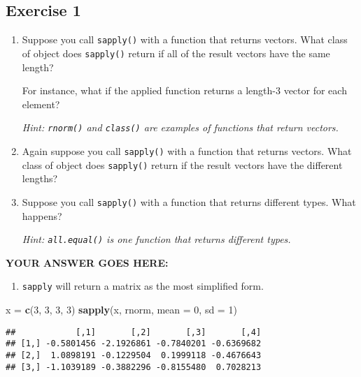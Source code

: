\documentclass[
]{article}
\newenvironment{Shaded}{\begin{snugshade}}{\end{snugshade}}
\newcommand{\DataTypeTok}[1]{\textcolor[rgb]{0.13,0.29,0.53}{#1}}
\newcommand{\DecValTok}[1]{\textcolor[rgb]{0.00,0.00,0.81}{#1}}
\newcommand{\KeywordTok}[1]{\textcolor[rgb]{0.13,0.29,0.53}{\textbf{#1}}}
\newcommand{\NormalTok}[1]{#1}
\newcommand{\StringTok}[1]{\textcolor[rgb]{0.31,0.60,0.02}{#1}}
\providecommand{\tightlist}{%
  \setlength{\itemsep}{0pt}\setlength{\parskip}{0pt}}
\begin{document}
\hypertarget{exercise-1}{%
\subsection{Exercise 1}\label{exercise-1}}

\begin{enumerate}
\def\labelenumi{\arabic{enumi}.}
\item
  Suppose you call \texttt{sapply()} with a function that returns
  vectors. What class of object does \texttt{sapply()} return if all of
  the result vectors have the same length?

  For instance, what if the applied function returns a length-3 vector
  for each element?

  \emph{Hint: \texttt{rnorm()} and \texttt{class()} are examples of
  functions that return vectors.}
\item
  Again suppose you call \texttt{sapply()} with a function that returns
  vectors. What class of object does \texttt{sapply()} return if the
  result vectors have the different lengths?
\item
  Suppose you call \texttt{sapply()} with a function that returns
  different types. What happens?

  \emph{Hint: \texttt{all.equal()} is one function that returns
  different types.}
\end{enumerate}

\textbf{YOUR ANSWER GOES HERE:}

\begin{enumerate}
\def\labelenumi{\arabic{enumi}.}
\tightlist
\item
  \texttt{sapply} will return a matrix as the most simplified form.
\end{enumerate}

\begin{Shaded}
\begin{Highlighting}[]
\NormalTok{x =}\StringTok{ }\KeywordTok{c}\NormalTok{(}\DecValTok{3}\NormalTok{, }\DecValTok{3}\NormalTok{, }\DecValTok{3}\NormalTok{, }\DecValTok{3}\NormalTok{)}
\KeywordTok{sapply}\NormalTok{(x, rnorm, }\DataTypeTok{mean =} \DecValTok{0}\NormalTok{, }\DataTypeTok{sd =} \DecValTok{1}\NormalTok{)}
\end{Highlighting}
\end{Shaded}

\begin{verbatim}
##            [,1]       [,2]       [,3]       [,4]
## [1,] -0.5801456 -2.1926861 -0.7840201 -0.6369682
## [2,]  1.0898191 -0.1229504  0.1999118 -0.4676643
## [3,] -1.1039189 -0.3882296 -0.8155480  0.7028213
\end{verbatim}
\end{document}
